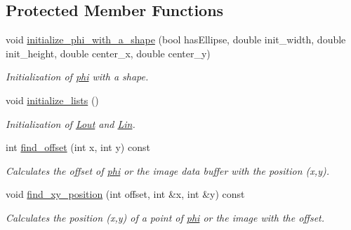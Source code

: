 \subsection*{Protected Member Functions}
\begin{DoxyCompactItemize}
\item 
\hypertarget{classofeli_1_1_active_contour_a39f22c1bc9d6740180a62520c3f67498}{void \hyperlink{classofeli_1_1_active_contour_a39f22c1bc9d6740180a62520c3f67498}{initialize\-\_\-phi\-\_\-with\-\_\-a\-\_\-shape} (bool has\-Ellipse, double init\-\_\-width, double init\-\_\-height, double center\-\_\-x, double center\-\_\-y)}\label{classofeli_1_1_active_contour_a39f22c1bc9d6740180a62520c3f67498}

\begin{DoxyCompactList}\small\item\em Initialization of \hyperlink{classofeli_1_1_active_contour_aacb03a6ded4ca51cb52f58aeff955ef7}{phi} with a shape. \end{DoxyCompactList}\item 
\hypertarget{classofeli_1_1_active_contour_a181d717496a28d8aac1095d0fc227220}{void \hyperlink{classofeli_1_1_active_contour_a181d717496a28d8aac1095d0fc227220}{initialize\-\_\-lists} ()}\label{classofeli_1_1_active_contour_a181d717496a28d8aac1095d0fc227220}

\begin{DoxyCompactList}\small\item\em Initialization of \hyperlink{classofeli_1_1_active_contour_a31e0eb18a7ea6ae90acf66ed018fcd85}{Lout} and \hyperlink{classofeli_1_1_active_contour_a7662d4f5c8b87d3e642b08b7e341bd79}{Lin}. \end{DoxyCompactList}\item 
\hypertarget{classofeli_1_1_active_contour_ae58a17c4d023abdd142ae24bf8335370}{int \hyperlink{classofeli_1_1_active_contour_ae58a17c4d023abdd142ae24bf8335370}{find\-\_\-offset} (int x, int y) const }\label{classofeli_1_1_active_contour_ae58a17c4d023abdd142ae24bf8335370}

\begin{DoxyCompactList}\small\item\em Calculates the offset of \hyperlink{classofeli_1_1_active_contour_aacb03a6ded4ca51cb52f58aeff955ef7}{phi} or the image data buffer with the position ({\itshape x},{\itshape y}). \end{DoxyCompactList}\item 
\hypertarget{classofeli_1_1_active_contour_adcb560ea7c8b763c7e4e769321807925}{void \hyperlink{classofeli_1_1_active_contour_adcb560ea7c8b763c7e4e769321807925}{find\-\_\-xy\-\_\-position} (int offset, int \&x, int \&y) const }\label{classofeli_1_1_active_contour_adcb560ea7c8b763c7e4e769321807925}

\begin{DoxyCompactList}\small\item\em Calculates the position ({\itshape x},{\itshape y}) of a point of \hyperlink{classofeli_1_1_active_contour_aacb03a6ded4ca51cb52f58aeff955ef7}{phi} or the image with the offset. \end{DoxyCompactList}\end{DoxyCompactItemize}
